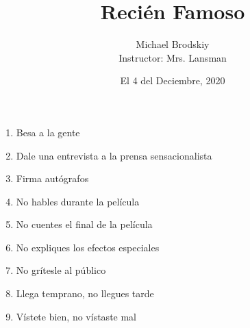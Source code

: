 \documentclass[12pt]{article}
\title{Reci\'en Famoso}
\date{El 4 del Deciembre, 2020}
\author{Michael Brodskiy\\ \small Instructor: Mrs. Lansman}
\begin{document}
\maketitle

\begin{enumerate}

  \item Besa a la gente

  \item Dale una entrevista a la prensa sensacionalista

  \item Firma aut\'ografos

  \item No hables durante la pel\'icula

  \item No cuentes el final de la pel\'icula
    
  \item No expliques los efectos especiales

  \item No gr\'itesle al p\'ublico

  \item Llega temprano, no llegues tarde

  \item V\'istete bien, no v\'istaste mal

\end{enumerate}
\end{document}
